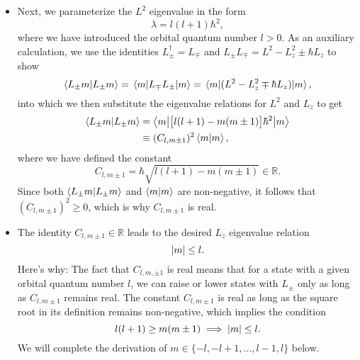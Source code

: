 \documentclass[11pt, a4paper]{article}
\newcommand{\bmel}[3]{\big \langle {#1} \big | {#2} \big | {#3} \big \rangle}  %
\begin{document}
\begin{itemize}
	\item Next, we parameterize the $ L^{2} $ eigenvalue in the form
    \begin{equation*}
        \lambda = l (l + 1) \hbar^{2},
    \end{equation*}
    where we have introduced the orbital quantum number $ l > 0 $. As an auxiliary calculation, we use the identities $ L_{\pm}^{\dagger} = L_{\mp} $ and $ L_{\pm}L_{\mp} = L^{2} - L_{z}^{2} \pm \hbar L_{z} $ to show
	\begin{equation*}
		\braket{L_{\pm}m}{L_{\pm}m} = \mel{m}{L_{\mp}L_{\pm}}{m} = \mel{m}{(L^{2} - L_{z}^{2} \mp \hbar L_{z})}{m},
	\end{equation*}
	into which we then substitute the eigenvalue relations for $ L^{2} $ and $ L_{z} $ to get
	\begin{align*}
		\braket{L_{\pm}m}{L_{\pm}m} &= \bmel{m}{\big[l (l+1) - m(m\pm 1)\big]\hbar^{2}}{m}\\
		&\equiv (C_{l,m\pm 1})^{2} \braket{m}{m},
	\end{align*}
	where we have defined the constant
	\begin{equation*}
		C_{l, m\pm1} = \hbar \sqrt{l (l+1) - m(m\pm 1)} \in \mathbb{R}.
	\end{equation*}
	Since both $ \braket{L_{\pm}m}{L_{\pm}m} $ and $ \braket{m}{m} $ are non-negative, it follows that $ (C_{l,m\pm 1})^{2} \geq 0 $, which is why $ C_{l, m\pm1} $ is real.
	
	\item The identity $  C_{l, m\pm1} \in \mathbb{R} $ leads to the desired $ L_{z} $ eigenvalue relation
    \begin{equation*}
        \abs{m} \leq l.
    \end{equation*}
    Here's why: The fact that $ C_{l, m, \pm 1} $ is real means that for a state with a given orbital quantum number $ l $, we can raise or lower states with $ L_{\pm} $ only as long as $  C_{l, m\pm1} $ remains real. The constant $ C_{l, m \pm 1} $ is real as long as the square root in its definition remains non-negative, which implies the condition
	\begin{equation*}
		l (l+1) \geq m(m\pm 1) \implies \abs{m} \leq l.
	\end{equation*}
    We will complete the derivation of $ m \in \{-l, -l+1, \ldots, l-1, l\} $ below.
	

\end{itemize}
\end{document}
